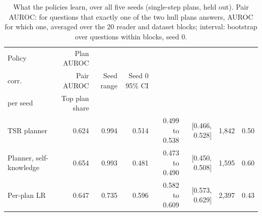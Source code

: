 \begin{table}[t]
\centering\small
\setlength{\tabcolsep}{4pt}
\caption{What the policies learn, over all five seeds (single-step plans, held out). Pair AUROC: for questions that exactly one of the two hull plans answers, AUROC for which one, averaged over the 20 reader and dataset blocks; interval: bootstrap over questions within blocks, seed 0.}
\label{tab:review_mechanism}
\begin{tabular*}{\linewidth}{@{\extracolsep{\fill}}lrrrrrrr}
\toprule
Policy & Plan AUROC & \begin{tabular}[b]{@{}r@{}}Cross plan \\ corr.\end{tabular} & Pair AUROC & Seed range & Seed 0 95\% CI & \begin{tabular}[b]{@{}r@{}}Pair questions \\ per seed\end{tabular} & Top plan share \\
\midrule
TSR planner & 0.624 & 0.994 & 0.514 & 0.499 to 0.538 & [0.466, 0.528] & 1,842 & 0.50 \\
Planner, self-knowledge & 0.654 & 0.993 & 0.481 & 0.473 to 0.490 & [0.450, 0.508] & 1,595 & 0.60 \\
Per-plan LR & 0.647 & 0.735 & 0.596 & 0.582 to 0.609 & [0.573, 0.629] & 2,397 & 0.43 \\
\bottomrule
\end{tabular*}
\end{table}
